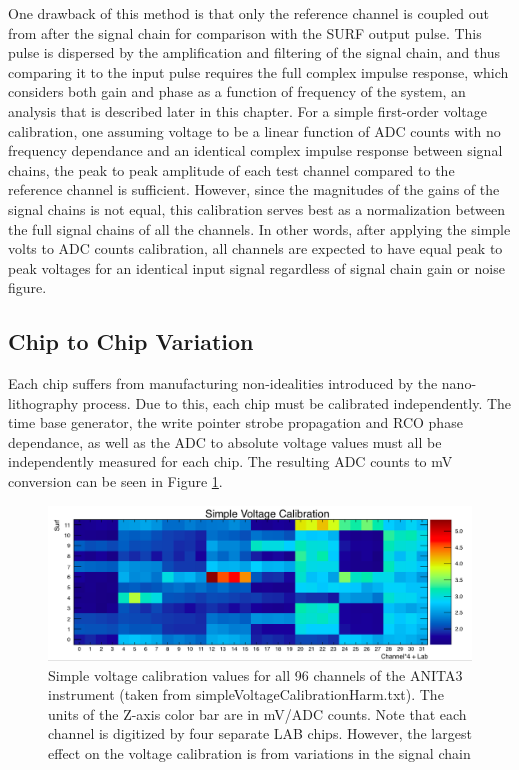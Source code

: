 	One drawback of this method is that only the reference channel is coupled out from after the signal chain for comparison with the SURF output pulse.  This pulse is dispersed by the amplification and filtering of the signal chain, and thus comparing it to the input pulse requires the full complex impulse response, which considers both gain and phase as a function of frequency of the system, an analysis that is described later in this chapter.  For a simple first-order voltage calibration, one assuming voltage to be a linear function of ADC counts with no frequency dependance and an identical complex impulse response between signal chains, the peak to peak amplitude of each test channel compared to the reference channel is sufficient.  However, since the magnitudes of the gains of the signal chains is not equal, this calibration serves best as a normalization between the full signal chains of all the channels.  In other words, after applying the simple volts to ADC counts calibration, all channels are expected to have equal peak to peak voltages for an identical input signal regardless of signal chain gain or noise figure.
		
		
		
	\subsection{Chip to Chip Variation}
		Each chip suffers from manufacturing non-idealities introduced by the nano-lithography process.  Due to this, each chip must be calibrated independently.  The time base generator, the write pointer strobe propagation and RCO phase dependance, as well as the ADC to absolute voltage values must all be independently measured for each chip.  The resulting ADC counts to mV conversion can be seen in Figure \ref{fig:adcTomV}.

			
	\begin{figure}
		\centering
		\includegraphics[width=\textwidth]{figures/ADCtoVolts.png}
		\caption{Simple voltage calibration values for all 96 channels of the ANITA3 instrument (taken from simpleVoltageCalibrationHarm.txt).  The units of the Z-axis color bar are in mV/ADC counts.  Note that each channel is digitized by four separate LAB chips.  However, the largest effect on the voltage calibration is from variations in the signal chain}
		\label{fig:adcTomV}
	\end{figure}
		



